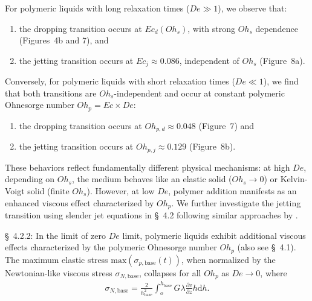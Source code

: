 \documentclass[]{article}
\newcommand{\oo}{\color{magenta} \normalfont}
\newcommand{\bb}{\color{black} \normalfont}
\begin{document}
\begin{enumerate}
	For polymeric liquids with long relaxation times ($De \gg 1$), we observe that:

	\begin{enumerate}
		\item the dropping transition occurs at $Ec_d(Oh_s)$, with strong $Oh_s$ dependence (Figures~4b and 7), and
		\item the jetting transition occurs at $Ec_j \approx 0.086$, independent of $Oh_s$ (Figure~8a).
	\end{enumerate}

	Conversely, for polymeric liquids with short relaxation times ($De \ll 1$), we find that both transitions are $Oh_s$-independent and occur at constant polymeric Ohnesorge number $Oh_p = Ec \times De$:

	\begin{enumerate}
		\item the dropping transition occurs at $Oh_{p,d} \approx 0.048$ (Figure~7) and
		\item the jetting transition occurs at $Oh_{p,j} \approx 0.129$ (Figure~8b).
	\end{enumerate}

	\oo
	These behaviors reflect fundamentally different physical mechanisms: at high $De$, depending on $Oh_s$, the medium behaves like an elastic solid ($Oh_s \to 0$) or Kelvin-Voigt solid (finite $Oh_s$). However, at low $De$, polymer addition manifests as an enhanced viscous effect characterized by $Oh_p$.\bb
	We further investigate the jetting transition using slender jet equations in \S~4.2 following similar approaches by \citet{driessen2013stability,gordillo2020impulsive,zinelis2023transition,sen2024elastocapillary}.

	\S~4.2.2:
	\oo
	In the limit of zero $De$ limit, polymeric liquids exhibit additional viscous effects characterized by the polymeric Ohnesorge number $Oh_p$ (also see \S~4.1).
	The maximum elastic stress $\text{max}(\sigma_{p,\text{base}}(t))$, when normalized by the Newtonian-like viscous stress $\sigma_{N,\text{base}}$, collapses for all $Oh_p$ as $De \to 0$, where
	\bb
	\begin{align}
		\sigma_{N,\text{base}} =  \frac{2}{h_{\text{base}}^2}\int_{o}^{h_{\text{base}}} G\lambda\frac{\partial v}{\partial z} h\mathrm{d}h.
	\end{align}


\end{enumerate}
\end{document}
